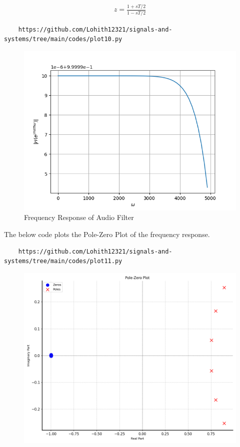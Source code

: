 \documentclass[journal,12pt,twocolumn]{IEEEtran}
\theoremstyle{remark}
\begin{document}
\begin{enumerate}[label=\thesection.\arabic*
,ref=\thesection.\theenumi]
\begin{enumerate}[label=\thesection.\arabic*
,ref=\thesection.\theenumi]
\begin{align}
    z=\frac{1+sT/2}{1-sT/2}
\end{align}
\begin{lstlisting}
    https://github.com/Lohith12321/signals-and-systems/tree/main/codes/plot10.py 
\end{lstlisting}
\begin{figure}[ht]
\centering
\includegraphics[width=1\columnwidth]{figs/plot10.png}
\caption{Frequency Response of Audio Filter}
\label{fig:plot10}
\end{figure}
The below code plots the Pole-Zero Plot of the frequency response.
\begin{lstlisting}
    https://github.com/Lohith12321/signals-and-systems/tree/main/codes/plot11.py 
\end{lstlisting}
\begin{figure}[ht]
\centering
\includegraphics[width=1\columnwidth]{figs/plot11.png}

\end{figure}
\end{enumerate}
\end{enumerate}
\end{document}

